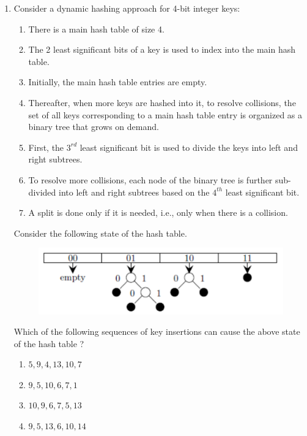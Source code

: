 \documentclass[a4paper, 11pt]{article}
\begin{document}
\begin{enumerate}
    \item Consider a dynamic hashing approach for 4-bit integer keys:
    \begin{enumerate}[label=\arabic*.]
        \item There is a main hash table of size 4.
        \item The 2 least significant bits of a key is used to index into the main hash table.
        \item Initially, the main hash table entries are empty.
        \item Thereafter, when more keys are hashed into it, to resolve collisions, the set of all keys corresponding to a main hash table entry is organized as a binary tree that grows on demand.
        \item First, the $3^{rd}$ least significant bit is used to divide the keys into left and right subtrees.
        \item To resolve more collisions, each node of the binary tree is further sub-divided into left and right subtrees based on the $4^{th}$ least significant bit.
        \item A split is done only if it is needed, i.e., only when there is a collision.
    \end{enumerate}
    Consider the following state of the hash table.
    \begin{figure}[h]
        \centering
        \includegraphics[width=\columnwidth]{figs/q57.png}
        \label{fig:placeholder}
    \end{figure}
    Which of the following sequences of key insertions can cause the above state of the hash table ?
    
    \begin{enumerate}
        \item $5, 9, 4, 13, 10, 7$
        \item $9, 5, 10, 6, 7, 1$
        \item $10, 9, 6, 7, 5, 13$
        \item $9, 5, 13, 6, 10, 14$
    \end{enumerate}
    \hfill{}
    

\end{enumerate}
\end{document}
